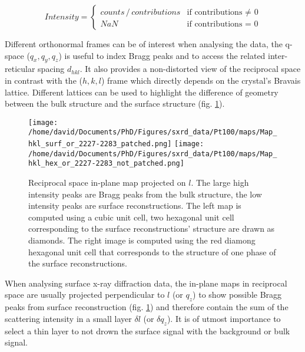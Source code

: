 \begin{equation}
    \label{eq:BinocularsIntensity}
    Intensity =
        \begin{cases}
            counts \, /  \,contributions  & \text{if contributions $\neq$ 0} \\
            NaN & \text{if contributions = 0}
        \end{cases}
\end{equation}

Different orthonormal frames can be of interest when analysing the data, the q-space ($q_x, q_y, q_z$) is useful to index Bragg peaks and to access the related inter-reticular spacing $d_{hkl}$.
It also provides a non-distorted view of the reciprocal space in contrast with the ($h, k, l$) frame which directly depends on the crystal's Bravais lattice.
Different lattices can be used to highlight the difference of geometry between the bulk structure and the surface structure (fig. \ref{fig:MapExampleBinoculars}).

\begin{figure}[!htb]
    \texttt{[image: /home/david/Documents/PhD/Figures/sxrd\_data/Pt100/maps/Map\_hkl\_surf\_or\_2227-2283\_patched.png]}
    \texttt{[image: /home/david/Documents/PhD/Figures/sxrd\_data/Pt100/maps/Map\_hkl\_hex\_or\_2227-2283\_not\_patched.png]}
    \caption{
    Reciprocal space in-plane map projected on $l$.
    The large high intensity peaks are Bragg peaks from the bulk structure, the low intensity peaks are surface reconstructions.
    The left map is computed using a cubic unit cell, two hexagonal unit cell corresponding to the surface reconstructions' structure are drawn as diamonds.
    The right image is computed using the red diamong hexagonal unit cell that corresponds to the structure of one phase of the surface reconstructions.
    }
    \label{fig:MapExampleBinoculars}
\end{figure}

When analysing surface x-ray diffraction data, the in-plane maps in reciprocal space are usually projected perpendicular to $l$ (or $q_z$) to show possible Bragg peaks from surface reconstruction (fig. \ref{fig:MapExampleBinoculars}) and therefore contain the sum of the scattering intensity in a small layer $\delta l$ (or $\delta q_z$).
It is of utmost importance to select a thin layer to not drown the surface signal with the background or bulk signal.

